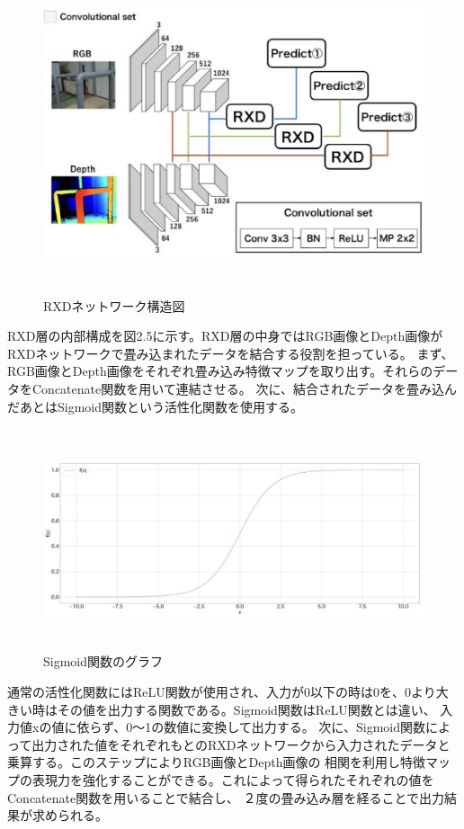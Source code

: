 \begin{figure}[htbt]
	\centering
	 \includegraphics[height=95mm]{RXDnet.eps}
	 \caption{RXDネットワーク構造図}
	 \label{fig:f2}
\end{figure}

RXD層の内部構成を図2.5に示す。RXD層の中身ではRGB画像とDepth画像がRXDネットワークで畳み込まれたデータを結合する役割を担っている。
まず、RGB画像とDepth画像をそれぞれ畳み込み特徴マップを取り出す。それらのデータをConcatenate関数を用いて連結させる。
次に、結合されたデータを畳み込んだあとはSigmoid関数という活性化関数を使用する。
\begin{figure}[htbt]
	\centering
	 \includegraphics[height=65mm]{sig.eps}
	 \caption{Sigmoid関数のグラフ}
	 \label{fig:f2}
\end{figure}
通常の活性化関数にはReLU関数が使用され、入力が0以下の時は0を、0より大きい時はその値を出力する関数である。Sigmoid関数はReLU関数とは違い、
入力値xの値に依らず、0～1の数値に変換して出力する。
次に、Sigmoid関数によって出力された値をそれぞれもとのRXDネットワークから入力されたデータと乗算する。このステップによりRGB画像とDepth画像の
相関を利用し特徴マップの表現力を強化することができる。これによって得られたそれぞれの値をConcatenate関数を用いることで結合し、
２度の畳み込み層を経ることで出力結果が求められる。


